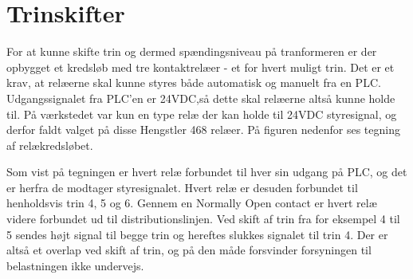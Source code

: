 

\section{Trinskifter}
For at kunne skifte trin og dermed spændingsniveau på tranformeren er der opbygget et kredsløb med tre kontaktrelæer - et for hvert muligt trin. Det er et krav, at relæerne skal kunne styres både automatisk og manuelt fra en PLC. Udgangssignalet fra PLC'en er 24VDC,så dette skal relæerne altså kunne holde til. På værkstedet var kun en type relæ der kan holde til 24VDC styresignal, og derfor faldt valget på disse Hengstler 468 relæer. På figuren nedenfor ses tegning af relækredsløbet.


Som vist på tegningen er hvert relæ forbundet til hver sin udgang på PLC, og det er herfra de modtager styresignalet. Hvert relæ er desuden forbundet til henholdsvis trin 4, 5 og 6. Gennem en Normally Open contact er hvert relæ videre forbundet ud til distributionslinjen. Ved skift af trin fra for eksempel 4 til 5 sendes højt signal til begge trin og hereftes slukkes signalet til trin 4. Der er altså et overlap ved skift af trin, og på den måde forsvinder forsyningen til belastningen ikke undervejs. 